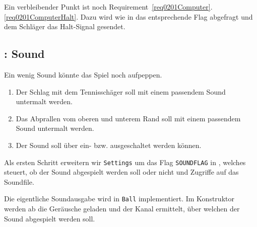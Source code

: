 
Ein verbleibender Punkt ist noch Requirement~\ref{req0201Computer}.\ref{req0201ComputerHalt}. Dazu wird wie in  das entsprechende Flag abgefragt und dem Schläger das Halt-Signal gesendet.

\newpage
{}



\subsection{: Sound}

Ein wenig Sound könnte das Spiel noch aufpeppen.

\begin{enumerate}
	\item Der Schlag mit dem Tennisschäger soll mit einem passendem Sound untermalt werden.\label{req0201Sound1}
	
	\item Das Abprallen vom oberen und unterem Rand soll mit einem passendem Sound untermalt werden.\label{req0201Sound2}
	
	\item Der Sound soll über  ein- bzw. ausgeschaltet werden können.\label{req0201Sound3}
	
\end{enumerate}
\er

Als ersten Schritt erweitern wir \texttt{Settings} um das Flag \texttt{SOUNDFLAG} in , welches steuert, ob der Sound abgespielt werden soll oder nicht und Zugriffe auf das Soundfile.

\newpage
{}

Die eigentliche Soundausgabe wird in \texttt{Ball} implementiert. Im Konstruktor werden ab  die Geräusche geladen und der Kanal ermittelt, über welchen der Sound abgespielt werden soll.



